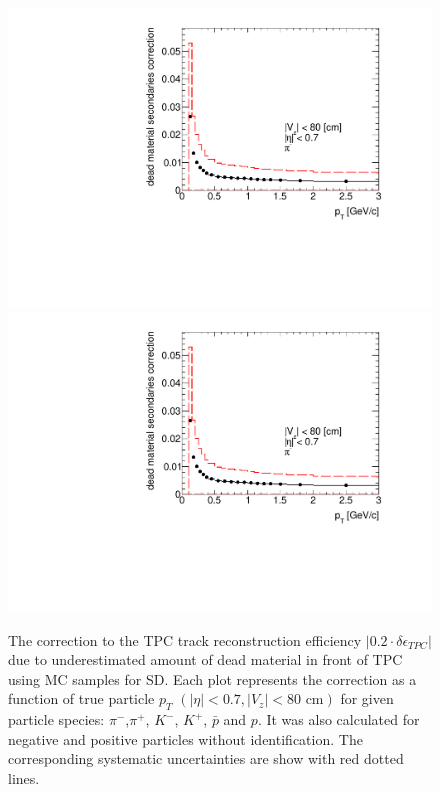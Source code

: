 \begin{figure}[hb]
	\caption[The correction to the TPC track reconstruction efficiency $|0.2\cdot\delta\epsilon_{ TPC}|$ due to underestimated amount of dead material in front of TPC using MC samples for SD]{The correction to the TPC track reconstruction efficiency $|0.2\cdot\delta\epsilon_{ TPC}|$ due to underestimated amount of dead material in front of TPC using MC samples for SD. Each plot represents the correction as a function of true particle $p_T$ $\left(|\eta|<0.7, |V_{z}|<80 \text{ cm}\right)$ for given particle species: $\pi^-$,$\pi^+$, $K^-$, $K^+$, $\bar{p}$ and $p$. It was also calculated for negative and positive particles without identification. The corresponding systematic uncertainties are show with red dotted lines. }\label{fig:dead_materialSD1D}
	\centering
	\parbox{0.495\textwidth}{
		\centering
		\includegraphics[width=\linewidth,page=1]{graphics/systematicsEfficiency/deadMaterial/secondaries_Unbinned_SD_1D.pdf}\\
		\includegraphics[width=\linewidth,page=2]{graphics/systematicsEfficiency/deadMaterial/secondaries_Unbinned_SD_1D.pdf}\\
}
\end{figure}
